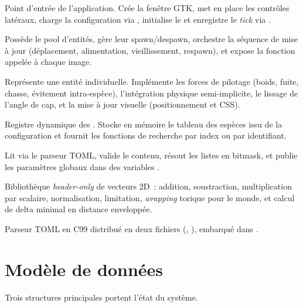 \begin{description}[leftmargin=3em, style=nextline]
  \item[\code{main}.] Point d'entrée de l'application. Crée la
    fenêtre GTK, met en place les contrôles latéraux, charge la
    configuration via , initialise le  et
    enregistre le \emph{tick} via .

  \item[\code{world}.] Possède le pool d'entités, gère leur
    spawn/despawn, orchestre la séquence de mise à jour
    (déplacement, alimentation, vieillissement, respawn), et
    expose la fonction  appelée à chaque
    image.

  \item[\code{entity}.] Représente une entité individuelle.
    Implémente les forces de pilotage (boids, fuite, chasse,
    évitement intra-espèce), l'intégration physique
    semi-implicite, le lissage de l'angle de cap, et la mise à
    jour visuelle (positionnement et CSS).

  \item[\code{species}.] Registre dynamique des
    . Stocke en mémoire le tableau des
    espèces issu de la configuration et fournit les fonctions
    de recherche par index ou par identifiant.

  \item[\code{conf}.] Lit  via le parseur
    TOML, valide le contenu, résout les listes  en
    bitmask, et publie les paramètres globaux dans des variables
    .

  \item[\code{vec2}.] Bibliothèque \emph{header-only} de
    vecteurs 2D~: addition, soustraction, multiplication par
    scalaire, normalisation, limitation, \emph{wrapping} torique
    pour le monde, et calcul de delta minimal en distance
    enveloppée.

  \item[\code{tomlc99} (vendor).] Parseur TOML en C99 distribué
    en deux fichiers (, ), embarqué
    dans .
\end{description}

\section{Modèle de données}

Trois structures principales portent l'état du système.

